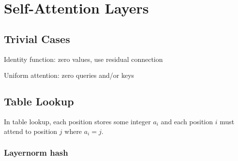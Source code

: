 %
\chapter{Self-Attention Layers}
%

\section{Trivial Cases}

Identity function: zero values, use residual connection

Uniform attention: zero queries and/or keys

\section{Table Lookup}

In table lookup, each position stores some integer $a_i$ and each position $i$ must attend to position $j$ where $a_i = j$.

\iffalse
\subsection{Single query}

If every position has the same query ($q^{(i)} = q$ for all $i$) and there is a minimum distance $\delta$ between all keys ($|k^{(i)}-k^{(j)}| \ge \delta$ for all $i,j$), then we can just use a FFNN to compute $\mathbb{I}[k^{(i)} = q^{(i)}] \delta$, which is piecewise linear \citep{chiang-cholak-2022-parity}:
\begin{center}
  \begin{tikzpicture}
    \begin{axis}[xtick={-1,0,1},xticklabels={$-\delta$,$0$,$\delta$,ytick={0,1},yticklabels={$0$,$\delta$}}}]
      \addplot[mark=none] coordinates { (-5,0) (-1,0) (0,1) (1,0) (5,0) };
    \end{axis}
  \end{tikzpicture}
\end{center}
(Since this doesn't use attention, it doesn't strictly belong in this chapter.)
\fi

\subsection{Layernorm hash}


